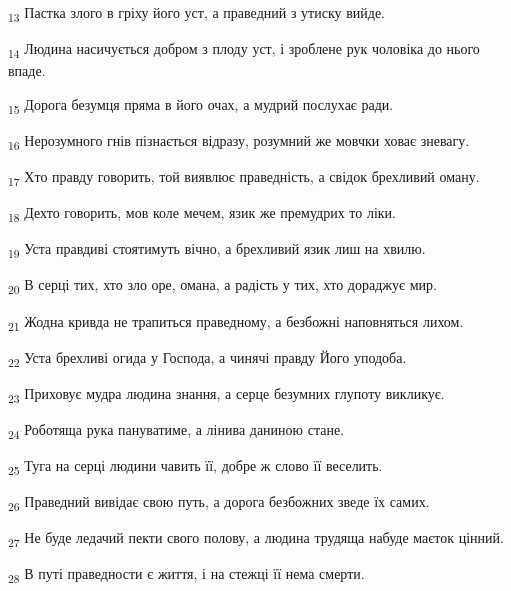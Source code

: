 \begin{tcolorbox}
\textsubscript{13} Пастка злого в гріху його уст, а праведний з утиску вийде.
\end{tcolorbox}
\begin{tcolorbox}
\textsubscript{14} Людина насичується добром з плоду уст, і зроблене рук чоловіка до нього впаде.
\end{tcolorbox}
\begin{tcolorbox}
\textsubscript{15} Дорога безумця пряма в його очах, а мудрий послухає ради.
\end{tcolorbox}
\begin{tcolorbox}
\textsubscript{16} Нерозумного гнів пізнається відразу, розумний же мовчки ховає зневагу.
\end{tcolorbox}
\begin{tcolorbox}
\textsubscript{17} Хто правду говорить, той виявлює праведність, а свідок брехливий оману.
\end{tcolorbox}
\begin{tcolorbox}
\textsubscript{18} Дехто говорить, мов коле мечем, язик же премудрих то ліки.
\end{tcolorbox}
\begin{tcolorbox}
\textsubscript{19} Уста правдиві стоятимуть вічно, а брехливий язик лиш на хвилю.
\end{tcolorbox}
\begin{tcolorbox}
\textsubscript{20} В серці тих, хто зло оре, омана, а радість у тих, хто дораджує мир.
\end{tcolorbox}
\begin{tcolorbox}
\textsubscript{21} Жодна кривда не трапиться праведному, а безбожні наповняться лихом.
\end{tcolorbox}
\begin{tcolorbox}
\textsubscript{22} Уста брехливі огида у Господа, а чинячі правду Його уподоба.
\end{tcolorbox}
\begin{tcolorbox}
\textsubscript{23} Приховує мудра людина знання, а серце безумних глупоту викликує.
\end{tcolorbox}
\begin{tcolorbox}
\textsubscript{24} Роботяща рука пануватиме, а лінива даниною стане.
\end{tcolorbox}
\begin{tcolorbox}
\textsubscript{25} Туга на серці людини чавить її, добре ж слово її веселить.
\end{tcolorbox}
\begin{tcolorbox}
\textsubscript{26} Праведний вивідає свою путь, а дорога безбожних зведе їх самих.
\end{tcolorbox}
\begin{tcolorbox}
\textsubscript{27} Не буде ледачий пекти свого полову, а людина трудяща набуде маєток цінний.
\end{tcolorbox}
\begin{tcolorbox}
\textsubscript{28} В путі праведности є життя, і на стежці її нема смерти.
\end{tcolorbox}
